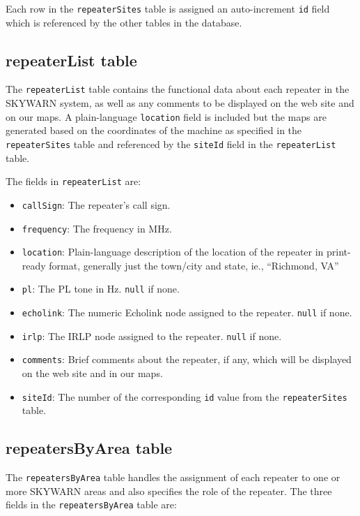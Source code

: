 \documentclass[pdflatex,letterpaper,twoside,12pt]{book}
\begin{document}
Each row in the \texttt{repeaterSites} table is assigned an auto-increment \texttt{id} field which is referenced by the other tables in the database.

\subsection{repeaterList table}

The \texttt{repeaterList} table contains the functional data about each repeater in the SKYWARN system, as well as any comments to be displayed on the web site and on our maps.  A plain-language \texttt{location} field is included but the maps are generated based on the coordinates of the machine as specified in the \texttt{repeaterSites} table and referenced by the \texttt{siteId} field in the \texttt{repeaterList} table.

The fields in \texttt{repeaterList} are:

\begin{itemize}
\item \texttt{callSign}:  The repeater's call sign.
\item \texttt{frequency}:  The frequency in MHz.
\item \texttt{location}:  Plain-language description of the location of the repeater in print-ready format, generally just the town/city and state, ie., ``Richmond, VA''
\item \texttt{pl}:  The PL tone in Hz.  \texttt{null} if none.
\item \texttt{echolink}:  The numeric Echolink node assigned to the repeater.  \texttt{null} if none.
\item \texttt{irlp}:  The IRLP node assigned to the repeater.  \texttt{null} if none.
\item \texttt{comments}:  Brief comments about the repeater, if any, which will be displayed on the web site and in our maps.
\item \texttt{siteId}:  The number of the corresponding \texttt{id} value from the \texttt{repeaterSites} table.
\end{itemize}

\subsection{repeatersByArea table}

The \texttt{repeatersByArea} table handles the assignment of each repeater to one or more SKYWARN areas and also specifies the role of the repeater.  The three fields in the \texttt{repeatersByArea} table are:
\end{document}
